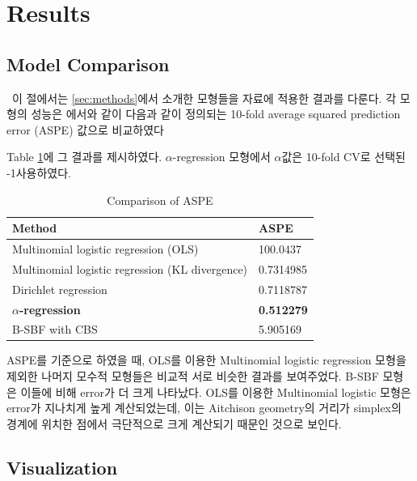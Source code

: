 \section{Results}\label{sec:results}


\subsection{Model Comparison}\label{sec:comparison}


\ \quad 이 절에서는 \ref{sec:methods}에서 소개한 모형들을 자료에 적용한 결과를 다룬다. 각 모형의 성능은 \citet{jeon2018additive}에서와 같이 다음과 같이 정의되는 10-fold average squared prediction error (ASPE) 값으로 비교하였다

Table \ref{table:1}에 그 결과를 제시하였다. $\alpha$-regression 모형에서 $\alpha$값은 10-fold CV로 선택된 -1\를 사용하였다.

\begin{table}[!h]
	\centering
	\begin{tabular}{ @{}ll@{}  } 
		\toprule
		Method & ASPE \\
		\midrule
		Multinomial logistic regression (OLS) & 100.0437 \\
		Multinomial logistic regression (KL divergence) & 0.7314985 \\
		Dirichlet regression & 0.7118787 \\
		\textbf{$\alpha$-regression \citep{tsagris2015regression}} & \textbf{0.512279} \\ 
		B-SBF with CBS & 5.905169 \\ 
		\bottomrule
	\end{tabular}
	\caption{Comparison of ASPE}
	\label{table:1}
\end{table}

ASPE를 기준으로 하였을 때, OLS를 이용한 Multinomial logistic regression 모형을 제외한 나머지 모수적 모형들은 비교적 서로 비슷한 결과를 보여주었다. B-SBF 모형은 이들에 비해 error가 더 크게 나타났다. OLS를 이용한 Multinomial logistic 모형은 error가 지나치게 높게 계산되었는데, 이는 Aitchison geometry의 거리가 simplex의 경계에 위치한 점에서 극단적으로 크게 계산되기 때문인 것으로 보인다.

\subsection{Visualization}\label{sec:visual}

